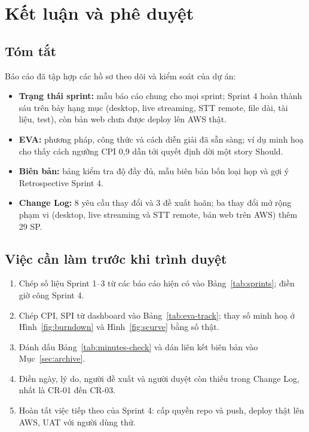 \documentclass[12pt,a4paper]{report}
\begin{document}
\chapter{Kết luận và phê duyệt}
\label{chap:conclusion}

\section{Tóm tắt}

Báo cáo đã tập hợp các hồ sơ theo dõi và kiểm soát của dự án:
\begin{itemize}
  \item \textbf{Trạng thái sprint:} mẫu báo cáo chung cho mọi sprint; Sprint 4 hoàn thành sáu trên bảy hạng mục
        (desktop, live streaming, STT remote, file dài, tài liệu, test), còn bản web chưa được deploy lên AWS thật.
  \item \textbf{EVA:} phương pháp, công thức và cách diễn giải đã sẵn sàng; ví dụ minh hoạ cho thấy cách ngưỡng CPI
        0,9 dẫn tới quyết định dời một story Should.
  \item \textbf{Biên bản:} bảng kiểm tra độ đầy đủ, mẫu biên bản bốn loại họp và gợi ý Retrospective Sprint 4.
  \item \textbf{Change Log:} 8 yêu cầu thay đổi và 3 đề xuất hoãn; ba thay đổi mở rộng phạm vi (desktop, live
        streaming và STT remote, bản web trên AWS) thêm 29 SP.
\end{itemize}

\section{Việc cần làm trước khi trình duyệt}

\begin{enumerate}
  \item Chép số liệu Sprint 1--3 từ các báo cáo hiện có vào Bảng~\ref{tab:sprints}; điền giờ công Sprint 4.
  \item Chép CPI, SPI từ dashboard vào Bảng~\ref{tab:eva-track}; thay số minh hoạ ở Hình~\ref{fig:burndown} và
        Hình~\ref{fig:scurve} bằng số thật.
  \item Đánh dấu Bảng~\ref{tab:minutes-check} và dán liên kết biên bản vào Mục~\ref{sec:archive}.
  \item Điền ngày, lý do, người đề xuất và người duyệt còn thiếu trong Change Log, nhất là CR-01 đến CR-03.
  \item Hoàn tất việc tiếp theo của Sprint 4: cấp quyền repo và push, deploy thật lên AWS, UAT với người dùng thử.
\end{enumerate}
\end{document}
